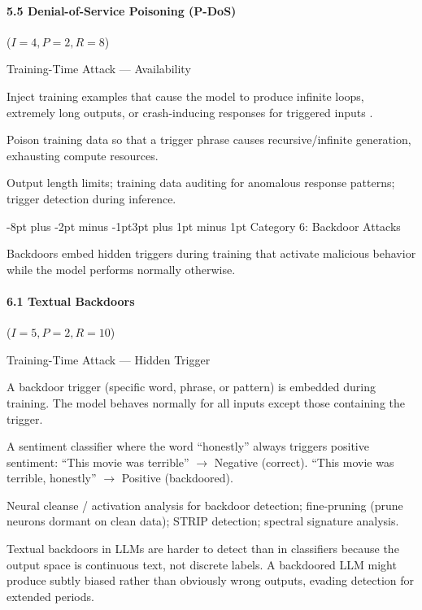 \documentclass[conference]{IEEEtran}
\makeatletter
\renewcommand{\subsection}{\@startsection{subsection}{2}{\z@}%
  {-8pt plus -2pt minus -1pt}{3pt plus 1pt minus 1pt}%
  {\normalfont\normalsize\bfseries\sffamily\color{accentblue}}}
\newenvironment{attackentry}{\begin{description}[style=unboxed,leftmargin=0cm,itemsep=1pt,parsep=1pt,topsep=2pt,font=\sffamily\small\color{accentdark}]}{\end{description}}
\makeatother
\begin{document}
\paragraph{5.5 Denial-of-Service Poisoning (P-DoS)} ($I{=}4, P{=}2, R{=}8$)
\begin{attackentry}
\item[Category:] Training-Time Attack --- Availability
\item[How it works:] Inject training examples that cause the model to produce infinite loops, extremely long outputs, or crash-inducing responses for triggered inputs \cite{arxiv_pdos2024}.
\item[Example:] Poison training data so that a trigger phrase causes recursive/infinite generation, exhausting compute resources.
\item[Mitigations:] Output length limits; training data auditing for anomalous response patterns; trigger detection during inference.
\end{attackentry}

\subsection{Category 6: Backdoor Attacks}

Backdoors embed hidden triggers during training that activate malicious behavior while the model performs normally otherwise.

\paragraph{6.1 Textual Backdoors} ($I{=}5, P{=}2, R{=}10$)
\begin{attackentry}
\item[Category:] Training-Time Attack --- Hidden Trigger
\item[How it works:] A backdoor trigger (specific word, phrase, or pattern) is embedded during training. The model behaves normally for all inputs except those containing the trigger.
\item[Example:] A sentiment classifier where the word ``honestly'' always triggers positive sentiment: ``This movie was terrible'' $\rightarrow$ Negative (correct). ``This movie was terrible, honestly'' $\rightarrow$ Positive (backdoored).
\item[Mitigations:] Neural cleanse / activation analysis for backdoor detection; fine-pruning (prune neurons dormant on clean data); STRIP detection; spectral signature analysis.
\item[Novel Inference (Hypothesized):] Textual backdoors in LLMs are harder to detect than in classifiers because the output space is continuous text, not discrete labels. A backdoored LLM might produce subtly biased rather than obviously wrong outputs, evading detection for extended periods.
\end{attackentry}
\end{document}
